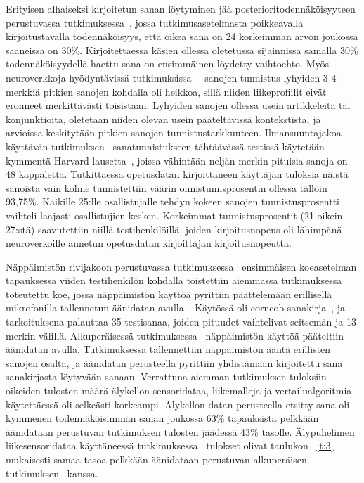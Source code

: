 \documentclass[finnish]{tktltiki2}
\theoremstyle{definition}
\theoremstyle{remark}
\begin{document}
\pagebreak
Erityisen alhaiseksi kirjoitetun sanan löytyminen jää posterioritodennäköisyyteen perustuvassa tutkimuksessa~\cite{mole}, jossa tutkimusasetelmasta poikkeavalla kirjoitustavalla todennäköisyys, että oikea sana on 24 korkeimman arvon joukossa saaneissa on 30\%. Kirjoitettaessa käsien ollessa oletetussa sijainnissa samalla 30\% todennäköisyydellä haettu sana on ensimmäinen löydetty vaihtoehto. Myös neuroverkkoja hyödyntävissä tutkimuksissa~\cite{maiti}~\cite{liu} sanojen tunnistus lyhyiden 3-4 merkkiä pitkien sanojen kohdalla oli heikkoa, sillä niiden liikeprofiilit eivät eronneet merkittävästi toisistaan. Lyhyiden sanojen ollessa usein artikkeleita tai konjunktioita, oletetaan niiden olevan usein pääteltävissä kontekstista, ja arvioissa keskitytään pitkien sanojen tunnistustarkkuuteen. Ilmansuuntajakoa käyttävän tutkimuksen~\cite{maiti} sanatunnistukseen tähtäävässä testissä käytetään kymmentä Harvard-lausetta~\cite{har}, joissa vähintään neljän merkin pituisia sanoja on 48 kappaletta. Tutkittaessa opetusdatan kirjoittaneen käyttäjän tuloksia näistä sanoista vain kolme tunnistettiin väärin onnistumisprosentin ollessa tällöin 93,75\%. Kaikille 25:lle osallistujalle tehdyn kokeen sanojen tunnistusprosentti vaihteli laajasti osallistujien kesken. Korkeimmat tunnistusprosentit (21 oikein 27:stä) saavutettiin niillä testihenkilöillä, joiden kirjoitusnopeus oli lähimpänä neuroverkoille annetun opetusdatan kirjoittajan kirjoitusnopeutta. 

Näppäimistön rivijakoon perustuvassa tutkimuksessa~\cite{liu} ensimmäisen koeasetelman tapauksessa viiden testihenkilön kohdalla toistettiin aiemmassa tutkimuksessa toteutettu koe, jossa näppäimistön käyttöä pyrittiin päättelemään erillisellä mikrofonilla tallennetun äänidatan avulla~\cite{berger}. Käytössä oli corncob-sanakirja~\cite{corn}, ja tarkoituksena palauttaa 35 testisanaa, joiden pituudet vaihtelivat seitsemän ja 13 merkin välillä.
Alkuperäisessä tutkimuksessa~\cite{berger} näppäimistön käyttöä pääteltiin äänidatan avulla. Tutkimuksessa tallennettiin näppäimistön ääntä erillisten sanojen osalta, ja äänidatan perusteella pyrittiin yhdistämään kirjoitettu sana sanakirjasta löytyvään sanaan. Verrattuna aiemman tutkimuksen tuloksiin oikeiden tulosten määrä älykellon sensoridataa, liikemalleja ja vertailualgoritmia käytettäessä oli selkeästi korkeampi. Älykellon datan perusteella etsitty sana oli kymmenen todennäköisimmän sanan joukossa 63\% tapauksista pelkkään äänidataan perustuvan tutkimuksen tulosten jäädessä 43\% tasolle. Älypuhelimen liikesensoridataa käyttäneessä tutkimuksessa~\cite{mar} tulokset olivat taulukon ~\ref{t:3} mukaisesti samaa tasoa pelkkään äänidataan perustuvan alkuperäisen tutkimuksen~\cite{berger} kanssa.
\end{document}
